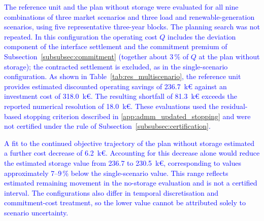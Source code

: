\documentclass[preprint,12pt]{elsarticle}
\begin{document}
\textcolor{blue}{
    The reference unit and the plan without storage were evaluated for all nine combinations of three market scenarios and three load and renewable-generation scenarios, using five representative three-year blocks. The planning search was not repeated. In this configuration the operating cost $Q$ includes the deviation component of the interface settlement and the commitment premium of Subsection~\ref{subsubsec:commitment} (together about 3\,\% of $Q$ at the plan without storage); the contracted settlement is excluded, as in the single-scenario configuration. As shown in Table~\ref{tab:res_multiscenario}, the reference unit provides estimated discounted operating savings of 236.7~k\euro{} against an investment cost of 318.0~k\euro{}. The resulting shortfall of 81.3~k\euro{} exceeds the reported numerical resolution of 18.0~k\euro{}. These evaluations used the residual-based stopping criterion described in \ref{app:admm_updated_stopping} and were not certified under the rule of Subsection~\ref{subsubsec:certification}.
}

\textcolor{blue}{
    A fit to the continued objective trajectory of the plan without storage estimated a further cost decrease of 6.2~k\euro{}. Accounting for this decrease alone would reduce the estimated storage value from 236.7 to 230.5~k\euro{}, corresponding to values approximately 7--9\,\% below the single-scenario value. This range reflects estimated remaining movement in the no-storage evaluation and is not a certified interval. The configurations also differ in temporal discretisation and commitment-cost treatment, so the lower value cannot be attributed solely to scenario uncertainty.
}
\end{document}
